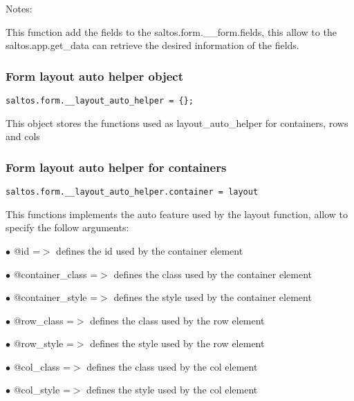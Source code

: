 \documentclass[a4paper]{article}
\begin{document}
Notes:

This function add the fields to the saltos.form.\_\_form.fields, this allow to the saltos.app.get\_data
can retrieve the desired information of the fields.

\hypertarget{toc780}{}
\subsubsection{Form layout auto helper object}

\begin{lstlisting}
saltos.form.__layout_auto_helper = {};
\end{lstlisting}

This object stores the functions used as layout\_auto\_helper for containers, rows and cols

\hypertarget{toc781}{}
\subsubsection{Form layout auto helper for containers}

\begin{lstlisting}
saltos.form.__layout_auto_helper.container = layout
\end{lstlisting}

This functions implements the auto feature used by the layout function, allow to specify the
follow arguments:

\begin{compactitem}
\item[\color{myblue}$\bullet$] @id              =$>$ defines the id used by the container element
\item[\color{myblue}$\bullet$] @container\_class =$>$ defines the class used by the container element
\item[\color{myblue}$\bullet$] @container\_style =$>$ defines the style used by the container element
\item[\color{myblue}$\bullet$] @row\_class       =$>$ defines the class used by the row element
\item[\color{myblue}$\bullet$] @row\_style       =$>$ defines the style used by the row element
\item[\color{myblue}$\bullet$] @col\_class       =$>$ defines the class used by the col element
\item[\color{myblue}$\bullet$] @col\_style       =$>$ defines the style used by the col element
\end{compactitem}
\end{document}
